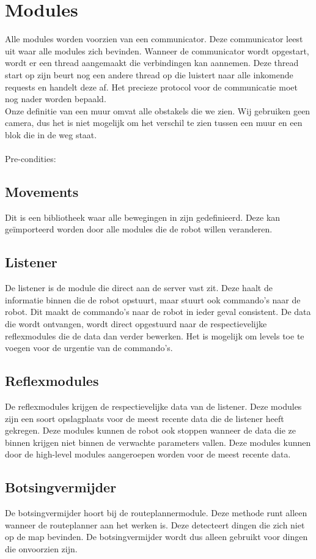 \documentclass[a4paper,10pt]{article}
\begin{document}
\section{Modules}
\label{sec:modules}
Alle modules worden voorzien van een communicator. Deze communicator leest uit waar alle modules zich bevinden. Wanneer de communicator wordt opgestart, wordt er een thread aangemaakt die verbindingen kan aannemen. Deze thread start op zijn beurt nog een andere thread op die luistert naar alle inkomende requests en handelt deze af. Het precieze protocol voor de communicatie moet nog nader worden bepaald. \\
Onze definitie van een muur omvat alle obstakels die we zien. Wij gebruiken geen camera, dus het is niet mogelijk om het verschil te zien tussen een muur en een blok die in de weg staat.\\
\\Pre-condities:
\subsection{Movements}
Dit is een bibliotheek waar alle bewegingen in zijn gedefinieerd. Deze kan ge\"{i}mporteerd worden door alle modules die de robot willen veranderen.
\subsection{Listener}
De listener is de module die direct aan de server vast zit. Deze haalt de informatie binnen die de robot opstuurt, maar stuurt ook commando's naar de robot. Dit maakt de commando's naar de robot in ieder geval consistent. De data die wordt ontvangen, wordt direct opgestuurd naar de respectievelijke reflexmodules die de data dan verder bewerken. Het is mogelijk om levels toe te voegen voor de urgentie van de commando's.
\subsection{Reflexmodules}
De reflexmodules krijgen de respectievelijke data van de listener. Deze modules zijn een soort opslagplaats voor de meest recente data die de listener heeft gekregen. Deze modules kunnen de robot ook stoppen wanneer de data die ze binnen krijgen niet binnen de verwachte parameters vallen. Deze modules kunnen door de high-level modules aangeroepen worden voor de meest recente data.
\subsection{Botsingvermijder}
De botsingvermijder hoort bij de routeplannermodule. Deze methode runt alleen wanneer de routeplanner aan het werken is. Deze detecteert dingen die zich niet op de map bevinden. De botsingvermijder wordt dus alleen gebruikt voor dingen die onvoorzien zijn.
\end{document}
